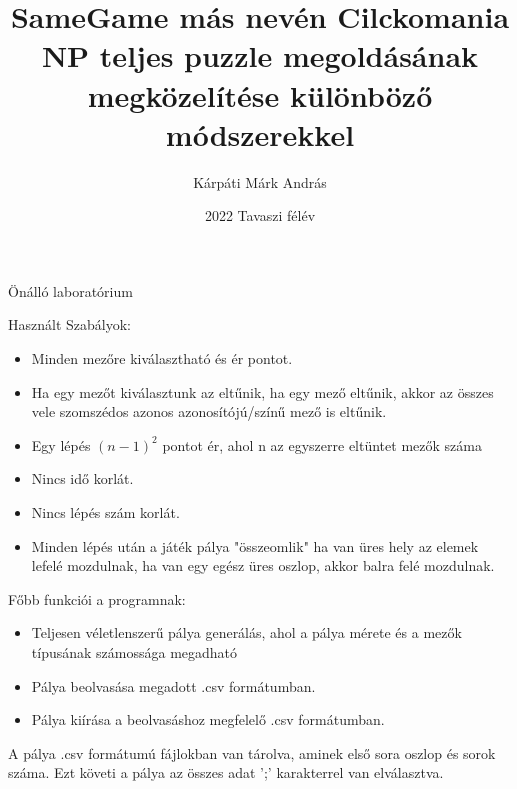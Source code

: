 \documentclass{article}
\title{SameGame más nevén Cilckomania NP teljes puzzle megoldásának megközelítése különböző módszerekkel}
\author{Kárpáti Márk András}
\date{2022 Tavaszi félév}
\begin{document}
	
	\maketitle
	
	Önálló laboratórium
	
	
	Használt Szabályok:
	\begin{itemize}		
		\item  Minden mezőre kiválasztható és ér pontot.
		\item Ha egy mezőt kiválasztunk az eltűnik, ha egy mező eltűnik, akkor az összes vele szomszédos azonos azonosítójú/színű mező is eltűnik.
		\item Egy lépés \( (n-1)^2 \) pontot ér, ahol n az egyszerre eltüntet mezők száma
		\item Nincs idő korlát.
		\item Nincs lépés szám korlát.
		\item Minden lépés után a játék pálya "összeomlik" ha van üres hely az elemek lefelé mozdulnak, ha van egy egész üres oszlop, akkor balra felé mozdulnak.
	\end{itemize}
	
	Főbb funkciói a programnak:
	\begin{itemize}
		\item Teljesen véletlenszerű pálya generálás, ahol a pálya mérete és a mezők típusának számossága megadható
		\item Pálya beolvasása megadott .csv formátumban.
		\item Pálya kiírása a beolvasáshoz megfelelő .csv formátumban.		
	\end{itemize}
	
	A pálya .csv formátumú fájlokban van tárolva, aminek első sora oszlop és sorok száma. Ezt követi a pálya az összes adat ';' karakterrel van elválasztva.
	
	
\end{document}
